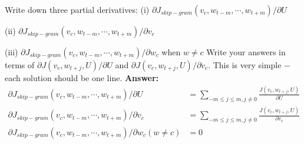 \documentclass{article}
\begin{document}
\medbreak
Write down three partial derivatives:
\medbreak
(i) $\partial J_{skip-gram}(v_c, w_{t-m}, \cdots, w_{t+m})/\partial U$

(ii) $\partial J_{skip-gram}(v_c, w_{t-m}, \cdots, w_{t+m})/\partial v_c$

(iii) $\partial J_{skip-gram}(v_c, w_{t-m}, \cdots, w_{t+m})/\partial w_c$ when $w \ne c$
\medbreak
Write your answers in terms of $\partial J(v_c, w_{t+j}, U)/\partial U$ and $\partial J(v_c, w_{t+j}, U)/\partial v_c$. This is very simple $-$ each solution should be one line.
\bigbreak
\noindent
\textbf{Answer:}
\begin{align*}
    \partial J_{skip-gram}(v_c, w_{t-m}, \cdots, w_{t+m})/\partial U &= \sum_{-m \leq j \leq m, j\ne 0} \frac{J(v_c, w_{t+j}, U)}{\partial U}\\
    \partial J_{skip-gram}(v_c, w_{t-m}, \cdots, w_{t+m})/\partial v_c &= \sum_{-m \leq j \leq m, j\ne 0} \frac{J(v_c, w_{t+j}, U)}{\partial v_c}\\
    \partial J_{skip-gram}(v_c, w_{t-m}, \cdots, w_{t+m})/\partial w_c (w \ne c) &= 0
\end{align*}

\bigbreak
\end{document}
